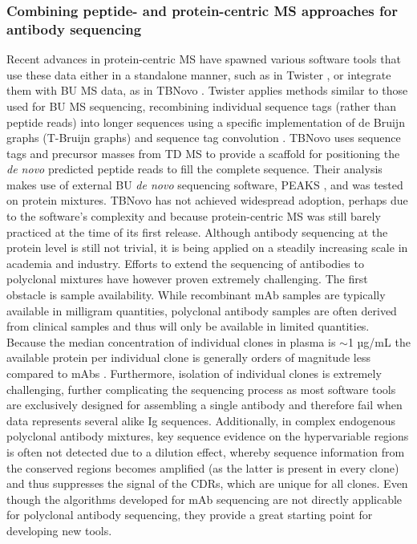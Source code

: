 \subsubsection{Combining peptide- and protein-centric MS approaches for antibody sequencing}
Recent advances in protein-centric MS have spawned various software tools that use these data either in a standalone manner, such as in Twister \cite{vyatkina2015de, vyatkina2017de}, or integrate them with BU MS data, as in TBNovo \cite{liu2014de}. Twister applies methods similar to those used for BU MS sequencing, recombining individual sequence tags (rather than peptide reads) into longer sequences using a specific implementation of de Bruijn graphs (T-Bruijn graphs) and sequence tag convolution \cite{vyatkina2015de, vyatkina2017de}. TBNovo uses sequence tags and precursor masses from TD MS to provide a scaffold for positioning the \emph{de novo} predicted peptide reads to fill the complete sequence. Their analysis makes use of external BU \emph{de novo} sequencing software, PEAKS \cite{ma2003peaks:}, and was tested on protein mixtures. TBNovo has not achieved widespread adoption, perhaps due to the software’s complexity and because protein-centric MS was still barely practiced at the time of its first release.
Although antibody sequencing at the protein level is still not trivial, it is being applied on a steadily increasing scale in academia and industry. Efforts to extend the sequencing of antibodies to polyclonal mixtures have however proven extremely challenging. The first obstacle is sample availability. While recombinant mAb samples are typically available in milligram quantities, polyclonal antibody samples are often derived from clinical samples and thus will only be available in limited quantities. Because the median concentration of individual clones in plasma is $\sim$1 µg/mL the available protein per individual clone is generally orders of magnitude less compared to mAbs \cite{bondt2021human}. Furthermore, isolation of individual clones is extremely challenging, further complicating the sequencing process as most software tools are exclusively designed for assembling a single antibody and therefore fail when data represents several alike Ig sequences. Additionally, in complex endogenous polyclonal antibody mixtures, key sequence evidence on the hypervariable regions is often not detected due to a dilution effect, whereby sequence information from the conserved regions becomes amplified (as the latter is present in every clone) and thus suppresses the signal of the CDRs, which are unique for all clones. Even though the algorithms developed for mAb sequencing are not directly applicable for polyclonal antibody sequencing, they provide a great starting point for developing new tools.

